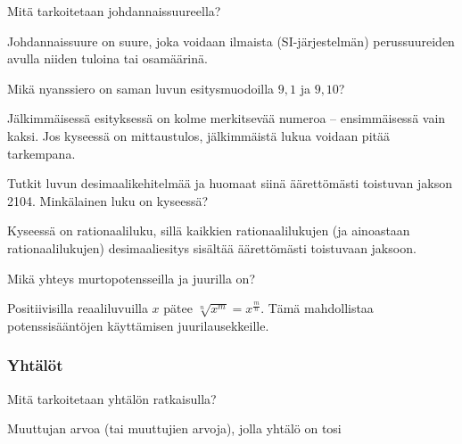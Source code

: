 \begin{multicols}{2}
\begin{tehtava}
Mitä tarkoitetaan johdannaissuureella?
\begin{vastaus}
Johdannaissuure on suure, joka voidaan ilmaista (SI-järjestelmän) perussuureiden avulla niiden tuloina tai osamäärinä.
\end{vastaus}
\end{tehtava}

\begin{tehtava}
Mikä nyanssiero on saman luvun esitysmuodoilla $9,1$ ja $9,10$?
\begin{vastaus}
Jälkimmäisessä esityksessä on kolme merkitsevää numeroa -- ensimmäisessä vain kaksi. Jos kyseessä on mittaustulos, jälkimmäistä lukua voidaan pitää tarkempana.
\end{vastaus}
\end{tehtava}

\begin{tehtava}
Tutkit luvun desimaalikehitelmää ja huomaat siinä äärettömästi toistuvan jakson 2104. Minkälainen luku on kyseessä?
\begin{vastaus}
Kyseessä on rationaaliluku, sillä kaikkien rationaalilukujen (ja ainoastaan rationaalilukujen) desimaaliesitys sisältää äärettömästi toistuvaan jaksoon.
\end{vastaus}
\end{tehtava}

\begin{tehtava}
Mikä yhteys murtopotensseilla ja juurilla on?
\begin{vastaus}
Positiivisilla reaaliluvuilla $x$ pätee $\sqrt[n]{x^m} = x^{\frac{m}{n}}$. Tämä mahdollistaa potenssisääntöjen käyttämisen juurilausekkeille.
\end{vastaus}
\end{tehtava}

\subsubsection*{Yhtälöt}

\begin{tehtava}
Mitä tarkoitetaan yhtälön ratkaisulla?
\begin{vastaus}
Muuttujan arvoa (tai muuttujien arvoja), jolla yhtälö on tosi
\end{vastaus}
\end{tehtava}


\end{multicols}
